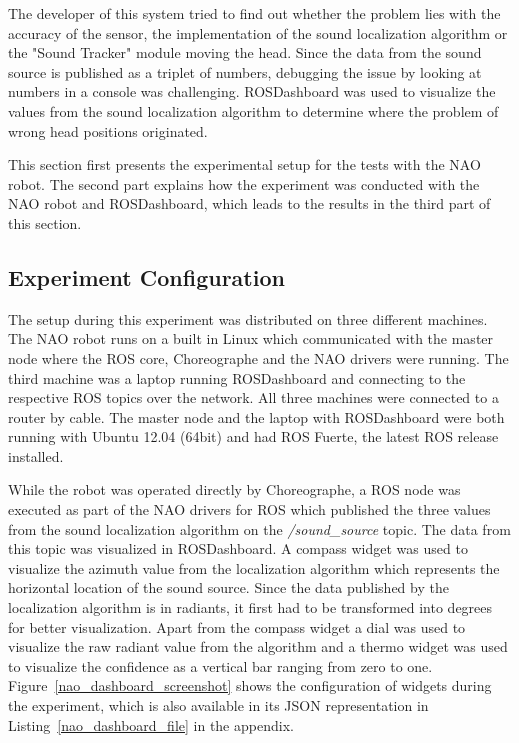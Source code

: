 The developer of this system tried to find out whether the problem lies with the accuracy of the sensor, the implementation of the sound localization algorithm or the "Sound Tracker" module moving the head. Since the data from the sound source is published as a triplet of numbers, debugging the issue by looking at numbers in a console was challenging. ROSDashboard was used to visualize the values from the sound localization algorithm to determine where the problem of wrong head positions originated.

This section first presents the experimental setup for the tests with the NAO robot. The second part explains how the experiment was conducted with the NAO robot and ROSDashboard, which leads to the results in the third part of this section.

\subsection{Experiment Configuration}
The setup during this experiment was distributed on three different machines. The NAO robot runs on a built in Linux which communicated with the master node where the ROS core, Choreographe and the NAO drivers were running. The third machine was a laptop running ROSDashboard and connecting to the respective ROS topics over the network. All three machines were connected to a router by cable. The master node and the laptop with ROSDashboard were both running with Ubuntu 12.04 (64bit) and had ROS Fuerte, the latest ROS release installed.

While the robot was operated directly by Choreographe, a ROS node was executed as part of the NAO drivers for ROS which published the three values from the sound localization algorithm on the \emph{/sound\_source} topic. The data from this topic was visualized in ROSDashboard. A compass widget was used to visualize the azimuth value from the localization algorithm which represents the horizontal location of the sound source. Since the data published by the localization algorithm is in radiants, it first had to be transformed into degrees for better visualization. Apart from the compass widget a dial was used to visualize the raw radiant value from the algorithm and a thermo widget was used to visualize the confidence as a vertical bar ranging from zero to one. Figure~\ref{nao_dashboard_screenshot} shows the configuration of widgets during the experiment, which is also available in its JSON representation in Listing~\ref{nao_dashboard_file} in the appendix.


